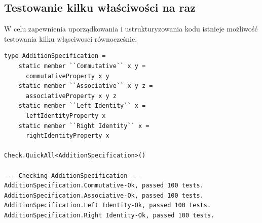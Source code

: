 \subsection{Testowanie kilku właściwości na raz}
W celu zapewnienia uporządkowania i ustrukturyzowania kodu istnieje możliwość testowania kilku włąsciwosci równocześnie.
\lstset{language=FSharp, basicstyle=\scriptsize}
\begin{lstlisting}[frame=single,caption={Sprawdzanie wielu właściwości jednocześnie},label=kod:listingA]
type AdditionSpecification =
    static member ``Commutative`` x y =
      commutativeProperty x y
    static member ``Associative`` x y z =
      associativeProperty x y z
    static member ``Left Identity`` x =
      leftIdentityProperty x
    static member ``Right Identity`` x =
      rightIdentityProperty x
  
Check.QuickAll<AdditionSpecification>()

--- Checking AdditionSpecification ---
AdditionSpecification.Commutative-Ok, passed 100 tests.
AdditionSpecification.Associative-Ok, passed 100 tests.
AdditionSpecification.Left Identity-Ok, passed 100 tests.
AdditionSpecification.Right Identity-Ok, passed 100 tests.
\end{lstlisting}